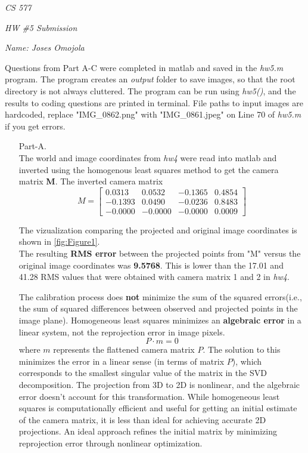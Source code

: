 \documentclass[12pt]{report}
\begin{document}
\centerline{\it CS 577}
\centerline{\it HW \#5 Submission}
\centerline{\it Name: Joses Omojola}

Questions from Part A-C were completed in matlab and saved in the \emph{hw5.m} program. The program creates an \emph{output} folder to save images, 
so that the root directory is not always cluttered. The program can be run using \textit{hw5()}, and the results to coding questions are printed in 
terminal. File paths to input images are hardcoded, replace "IMG\_0862.png" with "IMG\_0861.jpeg" on Line 70 of \emph{hw5.m} if you get errors.

\begin{enumerate}

    \item[Part-A.]
    \ \\
    The world and image coordinates from \emph{hw4} were read into matlab and inverted using the homogenous least squares method to get the camera 
    matrix \textbf{M}. The inverted camera matrix 
    \[
    M = 
    \begin{bmatrix}
    0.0313 & 0.0532 & -0.1365 & 0.4854 \\
    -0.1393 & 0.0490 & -0.0236 & 0.8483 \\
    -0.0000 & -0.0000 & -0.0000 & 0.0009
    \end{bmatrix}
    \]

    The vizualization comparing the projected and original image coordinates is shown in \autoref{fig:Figure1}.\\
    The resulting \textbf{RMS error} between the projected points from "M" versus the original image coordinates was \textbf{9.5768}. This is lower than 
    the 17.01 and 41.28 RMS values that were obtained with camera matrix 1 and 2 in \emph{hw4}.  
    
    The calibration process does \textbf{not} minimize the sum of the squared errors(i.e., the sum of squared differences between observed and projected 
    points in the image plane). Homogeneous least squares minimizes an \textbf{algebraic error} in a linear system, not the reprojection error in image pixels. 
    $$P \cdot m = 0$$
    where $m$ represents the flattened camera matrix $P$. The solution to this minimizes the error in a linear sense (in terms of matrix $P$), which 
    corresponds to the smallest singular value of the matrix in the SVD decomposition. The projection from 3D to 2D is nonlinear, and the algebraic error 
    doesn't account for this transformation. While homogeneous least squares is computationally efficient and useful for getting an initial estimate of 
    the camera matrix, it is less than ideal for achieving accurate 2D projections. An ideal approach refines the initial matrix by minimizing reprojection 
    error through nonlinear optimization.


\end{enumerate}
\end{document}
